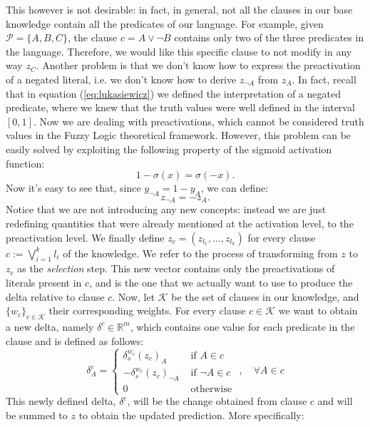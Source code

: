 This however is not desirable: in fact, in general, not all the clauses in our base knowledge contain all the predicates of our language. For example, given $\mathcal{P}=\{A,B,C\}$, the clause $c = A \vee \neg B$ contains only two of the three predicates in the language. Therefore, we would like this specific clause to not modify in any way $z_C$. Another problem is that we don't know how to express the preactivation of a negated literal, i.e. we don't know how to derive $z_{\neg A}$ from $z_A$. In fact, recall that in equation (\ref{eq:lukasiewicz}) we defined the interpretation of a negated predicate, where we knew that the truth values were well defined in the interval $\left[0,1\right]$. Now we are dealing with preactivations, which cannot be considered truth values in the Fuzzy Logic theoretical framework. However, this problem can be easily solved by exploiting the following property of the sigmoid activation function:
\begin{equation*}
1 - \sigma(x) = \sigma(-x).
\end{equation*}
Now it's easy to see that, since $y_{\neg A} = 1 - y_A$, we can define:
\begin{equation*}
z_{\neg A} = -z_A.
\end{equation*}
Notice that we are not introducing any new concepts: instead we are just redefining quantities that were already mentioned at the activation level, to the preactivation level. %
We finally define $z_c = \left(z_{l_1}, \dots, z_{l_k}\right)$ for every clause $c := \bigvee_{i=1}^k l_i$ of the knowledge. We refer to the process of transforming from $z$ to $z_c$ as the \textit{selection} step. This new vector contains only the preactivations of literals present in $c$, and is the one that we actually want to use to produce the delta relative to clause $c$. Now, let $\mathcal{K}$ be the set of clauses in our knowledge, and $\{w_c\}_{c\in\mathcal{K}}$ their corresponding weights. For every clause $c\in \mathcal{K}$ we want to obtain a new delta, namely $\delta^c \in \mathbb{R}^m$, which contains one value for each predicate in the clause and is defined as follows:
\begin{equation}
\delta_{A}^{c}= \begin{cases}\delta_{s}^{w_{c}}\left(z_{c}\right)_{A} & \text { if } A \in c \\ -\delta_{s}^{w_{c}}\left(z_{c}\right)_{\neg A} & \text { if } \neg A \in c \\ 0 & \text { otherwise }\end{cases}, \quad \forall A \in c
\label{eq:delta_c}
\end{equation}
This newly defined delta, $\delta^c$, will be \textcolor{unipd}{the change obtained from} clause $c$ and will be summed to $z$ to obtain the updated prediction. More specifically:

